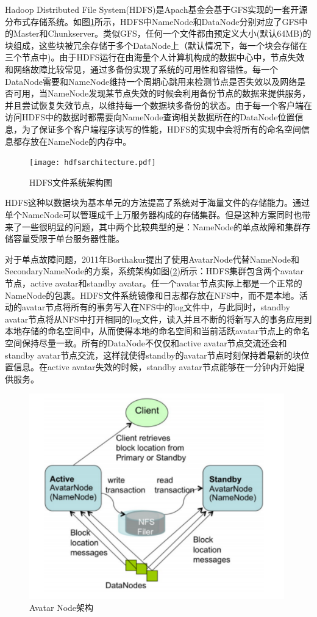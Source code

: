 Hadoop Distributed File System(HDFS)是Apach基金会基于GFS实现的一套开源分布式存储系统。如图\ref{fig:hdfsarch}所示，HDFS中NameNode和DataNode分别对应了GFS中的Master和Chunkserver。类似GFS，任何一个文件都由预定义大小(默认64MB)的块组成，这些块被冗余存储于多个DataNode上（默认情况下，每一个块会存储在三个节点中)。由于HDFS运行在由海量个人计算机构成的数据中心中，节点失效和网络故障比较常见，通过多备份实现了系统的可用性和容错性。每一个DataNode需要和NameNode维持一个周期心跳用来检测节点是否失效以及网络是否可用，当NameNode发现某节点失效的时候会利用备份节点的数据来提供服务，并且尝试恢复失效节点，以维持每一个数据块多备份的状态。由于每一个客户端在访问HDFS中的数据时都需要向NameNode查询相关数据所在的DataNode位置信息，为了保证多个客户端程序读写的性能，HDFS的实现中会将所有的命名空间信息都存放在NameNode的内存中。

\begin{figure}[h!]
	\centering
	\texttt{[image: hdfsarchitecture.pdf]}
	\caption{HDFS文件系统架构图}
	\label{fig:hdfsarch}
\end{figure}

HDFS这种以数据块为基本单元的方法提高了系统对于海量文件的存储能力。通过单个NameNode可以管理成千上万服务器构成的存储集群。但是这种方案同时也带来了一些很明显的问题，其中两个比较典型的是：NameNode的单点故障和集群存储容量受限于单台服务器性能。

对于单点故障问题，2011年Borthakur\cite{borthakur2011apache}提出了使用AvatarNode代替NameNode和SecondaryNameNode的方案，系统架构如图(\ref{fig:avatar})所示：HDFS集群包含两个avatar节点，active avatar和standby avatar。任一个avatar节点实际上都是一个正常的NameNode的包裹。HDFS文件系统镜像和日志都存放在NFS中，而不是本地。活动的avatar节点将所有的事务写入在NFS中的log文件中，与此同时，standby avatar节点将从NFS中打开相同的log文件，读入并且不断的将新写入的事务应用到本地存储的命名空间中，从而使得本地的命名空间和当前活跃avatar节点上的命名空间保持尽量一致。所有的DataNode不仅仅和active avatar节点交流还会和standby avatar节点交流，这样就使得standby的avatar节点时刻保持着最新的块位置信息。在active avatar失效的时候，standby avatar节点能够在一分钟内开始提供服务。

\begin{figure}[h!]
\centering
\includegraphics[height=3.5in]{../figures/avatarfb.pdf}
\caption{Avatar Node架构}
\label{fig:avatar}
\end{figure}

